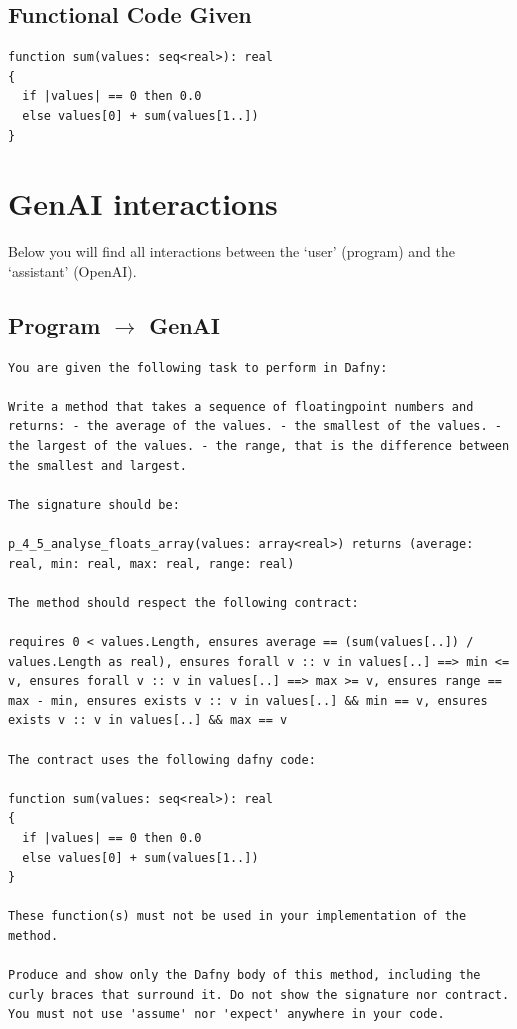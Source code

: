 \documentclass{article}
\begin{document}
\subsection*{Functional Code Given}
\begin{lstlisting}
function sum(values: seq<real>): real
{
  if |values| == 0 then 0.0
  else values[0] + sum(values[1..])
}
\end{lstlisting}
\clearpage
\section*{GenAI interactions}
Below you will find all interactions between the `user' (program) and the `assistant' (OpenAI).
\subsection*{Program $\rightarrow$ GenAI}
\begin{lstlisting}
You are given the following task to perform in Dafny:

Write a method that takes a sequence of floatingpoint numbers and returns: - the average of the values. - the smallest of the values. - the largest of the values. - the range, that is the difference between the smallest and largest.

The signature should be:

p_4_5_analyse_floats_array(values: array<real>) returns (average: real, min: real, max: real, range: real)

The method should respect the following contract:

requires 0 < values.Length, ensures average == (sum(values[..]) / values.Length as real), ensures forall v :: v in values[..] ==> min <= v, ensures forall v :: v in values[..] ==> max >= v, ensures range == max - min, ensures exists v :: v in values[..] && min == v, ensures exists v :: v in values[..] && max == v

The contract uses the following dafny code:

function sum(values: seq<real>): real
{
  if |values| == 0 then 0.0
  else values[0] + sum(values[1..])
}

These function(s) must not be used in your implementation of the method.

Produce and show only the Dafny body of this method, including the curly braces that surround it. Do not show the signature nor contract. You must not use 'assume' nor 'expect' anywhere in your code.
\end{lstlisting}
\end{document}

